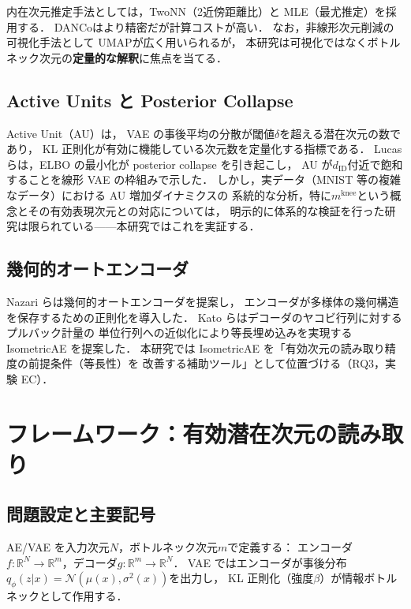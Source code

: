 \documentclass[11pt,a4paper]{jsarticle}
\newcommand{\R}{\mathbb{R}}
\newcommand{\mknee}{m^{\mathrm{knee}}}
\begin{document}
内在次元推定手法としては，TwoNN\cite{facco2017twonn}（2近傍距離比）と
MLE\cite{levina2005mle}（最尤推定）を採用する．
DANCo\cite{ceruti2014danco}はより精密だが計算コストが高い．
なお，非線形次元削減の可視化手法として UMAP\cite{mcinnes2018umap}が広く用いられるが，
本研究は可視化ではなくボトルネック次元の\textbf{定量的な解釈}に焦点を当てる．

\subsection{Active Units と Posterior Collapse}\label{sec:related_au}

Active Unit（AU）\cite{lucas2019elbo,higgins2017betavae}は，
VAE の事後平均の分散が閾値$\delta$を超える潜在次元の数であり，
KL 正則化が有効に機能している次元数を定量化する指標である．
Lucas ら\cite{lucas2019elbo}は，ELBO の最小化が posterior collapse を引き起こし，
AU が$d_{\mathrm{ID}}$付近で飽和することを線形 VAE の枠組みで示した．
しかし，実データ（MNIST 等の複雑なデータ）における AU 増加ダイナミクスの
系統的な分析，特に$\mknee$という概念とその有効表現次元との対応については，
明示的に体系的な検証を行った研究は限られている——本研究ではこれを実証する．

\subsection{幾何的オートエンコーダ}\label{sec:related_geo}

Nazari ら\cite{nazari2023geometric}は幾何的オートエンコーダを提案し，
エンコーダが多様体の幾何構造を保存するための正則化を導入した．
Kato ら\cite{kato2020rdae}はデコーダのヤコビ行列に対するプルバック計量の
単位行列への近似化により等長埋め込みを実現する IsometricAE を提案した．
本研究では IsometricAE を「有効次元の読み取り精度の前提条件（等長性）を
改善する補助ツール」として位置づける（RQ3，実験 EC）．

\section{フレームワーク：有効潜在次元の読み取り}\label{sec:framework}

\subsection{問題設定と主要記号}\label{sec:framework_setup}

AE/VAE を入力次元$N$，ボトルネック次元$m$で定義する：
エンコーダ$f: \R^N \to \R^m$，デコーダ$g: \R^m \to \R^N$．
VAE ではエンコーダが事後分布$q_\phi(z|x) = \mathcal{N}(\mu(x), \sigma^2(x))$を出力し，
KL 正則化（強度$\beta$）が情報ボトルネックとして作用する．
\end{document}
